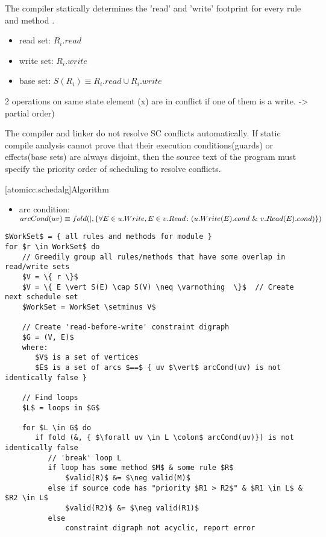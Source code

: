 The compiler statically determines the 'read' and 'write'
footprint for every rule and method \cite[Sec.~10.1.2]{OV11} \cite{doi:10.1137/0213032}.
\begin{itemize}
\item read set: $R_{i}.read$
\item write set: $R_{i}.write$
\item base set: $S(R_{i}) \equiv R_{i}.read \cup R_{i}.write$
\end{itemize}
\cite[Sec.~10.1.2]{OV11}
\cite[Sec.~11.1]{OV11}  2 operations on same state element (x) are in conflict if
one of them is a write. -> partial order)

The compiler and linker do not resolve SC conflicts automatically.
If static compile analysis cannot prove that their execution conditions(guards) or
effects(base sets) are always disjoint,
then the source text of the program must specify the priority order of scheduling
to resolve conflicts.

[atomicc.schedalg]{Algorithm}
\begin{itemize}
\item arc condition: $arcCond(uv) \equiv
\newline
      fold (|, \{ \forall E \in u.Write, E \in v.Read \colon (u.Write(E).cond\ \&\ v.Read(E).cond) \})$
\end{itemize}

\begin{lstlisting}[mathescape=true]
$WorkSet$ = { all rules and methods for module }
for $r \in WorkSet$ do
    // Greedily group all rules/methods that have some overlap in read/write sets
    $V = \{ r \}$
    $V = \{ E \vert S(E) \cap S(V) \neq \varnothing  \}$  // Create next schedule set
    $WorkSet = WorkSet \setminus V$

    // Create 'read-before-write' constraint digraph
    $G = (V, E)$
    where: 
       $V$ is a set of vertices
       $E$ is a set of arcs $==$ { uv $\vert$ arcCond(uv) is not identically false }

    // Find loops
    $L$ = loops in $G$

    for $L \in G$ do
       if fold (&, { $\forall uv \in L \colon$ arcCond(uv)}) is not identically false
          // 'break' loop L
          if loop has some method $M$ & some rule $R$
              $valid(R)$ &= $\neg valid(M)$
          else if source code has "priority $R1 > R2$" & $R1 \in L$ & $R2 \in L$
              $valid(R2)$ &= $\neg valid(R1)$
          else
              constraint digraph not acyclic, report error
\end{lstlisting}

